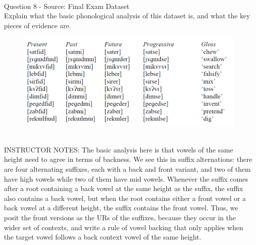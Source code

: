 \documentclass[12pt]{article}
\begin{document}
~\\

{\large Question 8} - Source: Final Exam Dataset\\

Explain what the basic phonological analysis of this dataset is, and what the key pieces of evidence are.\\

\begin{figure}[H]
\includegraphics{../images/final_dataset.png}
\end{figure}

~\\
INSTRUCTOR NOTES: The basic analysis here is that vowels of the same height need to agree in terms of backness. We see this in suffix alternations: there are four alternating suffixes, each with a back and front variant, and two of them have high vowels while two of them have mid vowels. Whenever the suffix comes after a root containing a back vowel at the same height as the suffix, the suffix also contains a back vowel, but when the root contains either a front vowel or a back vowel at a different height, the suffix contains the front vowel. Thus, we posit the front versions as the URs of the suffixes, because they occur in the wider set of contexts, and write a rule of vowel backing that only applies when the target vowel follows a back context vowel of the same height.




\newpage
\end{document}
